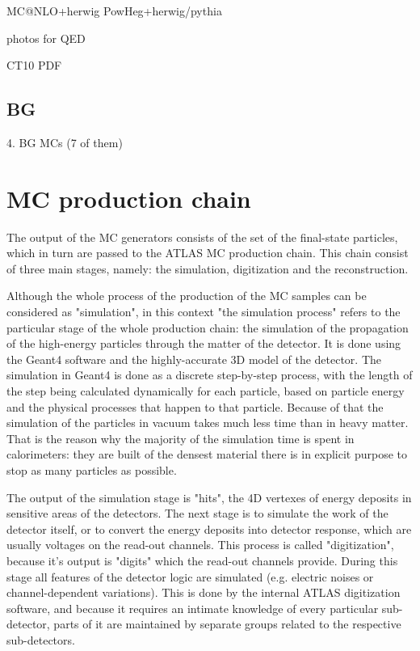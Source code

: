 MC@NLO+herwig PowHeg+herwig/pythia

photos for QED

CT10 PDF

\subsection{BG}
4. BG MCs (7 of them)

\section{MC production chain}
\label{sec:MC_sim_rec}

The output of the MC generators consists of the set of the final-state particles, which in turn are passed to the ATLAS MC production chain. This chain consist of three main stages, namely: the simulation, digitization and the reconstruction.

Although the whole process of the production of the MC samples can be considered as "simulation", in this context "the simulation process" refers to the particular stage of the whole production chain: the simulation of the propagation of the high-energy particles through the matter of the detector. It is done using the Geant4 software and the highly-accurate 3D model of the detector. The simulation in Geant4 is done as a discrete step-by-step process, with the length of the step being calculated dynamically for each particle, based on particle energy and the physical processes that happen to that particle. Because of that the simulation of the particles in vacuum takes much less time than in heavy matter. That is the reason why the majority of the simulation time is spent in calorimeters: they are built of the densest material there is in explicit purpose to stop as many particles as possible.

The output of the simulation stage is "hits", the 4D vertexes of energy deposits in sensitive areas of the detectors. The next stage is to simulate the work of the detector itself, or to convert the energy deposits into detector response, which are usually voltages on the read-out channels. This process is called "digitization", because it's output is "digits" which the read-out channels provide. During this stage all features of the detector logic are simulated (e.g. electric noises or channel-dependent variations). This is done by the internal ATLAS digitization software, and because it requires an intimate knowledge of every particular sub-detector, parts of it are maintained by separate groups related to the respective sub-detectors.

